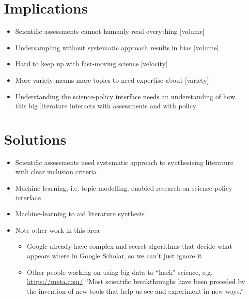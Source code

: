 \documentclass{article}
\begin{document}
\section{Implications}
\begin{itemize}
	\item Scientific assessments cannot humanly read everything [volume]
    \item Undersampling without systematic approach results in bias [volume]
    \item Hard to keep up with fast-moving science [velocity]
    \item More variety means more topics to need expertise about [variety]
    \item Understanding the science-policy interface needs an understanding of how this big literature interacts with assessments and with policy
\end{itemize}

\section{Solutions}

\begin{itemize}
	\item Scientific assessments need systematic approach to synthesising literature with clear inclusion criteria
    \item Machine-learning, i.e. topic modelling, enabled research on science policy interface
    \item Machine-learning to aid literature synthesis
    \item Note other work in this area
    \begin{itemize}
    	\item Google already have complex and secret algorithms that decide what appears where in Google Scholar, so we can't just ignore it
        \item Other people working on using big data to ``hack'' science, e.g. \url{https://meta.com/} ``Most scientific breakthroughs have been preceded by the invention of new tools that help us see and experiment in new ways.'' 
    \end{itemize}
\end{itemize}


\listoffigures




\end{document}
